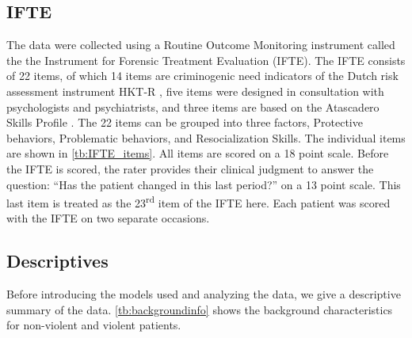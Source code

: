 \documentclass[a4paper,11pt]{article}
\newcommand{\DB}[1]{\todo[inline, color=colorDon]{DB: {#1}}}
\begin{document}
\subsection{IFTE}
The data were collected using a Routine Outcome Monitoring instrument called the the Instrument for Forensic Treatment Evaluation (IFTE).
The IFTE consists of 22 items, of which 14 items are criminogenic need indicators of the Dutch risk assessment instrument HKT-R \parencite{spreen2013handleiding}, five items were designed in consultation with psychologists and psychiatrists, and three items are based on the Atascadero Skills Profile \parencite{vess2001development}.
The 22 items can be grouped into three factors, Protective behaviors, Problematic behaviors, and Resocialization Skills.
The individual items are shown in \autoref{tb:IFTE_items}.
All items are scored on a 18 point scale.
Before the IFTE is scored, the rater provides their clinical judgment to answer the question: ``Has the patient changed in this last period?'' on a 13 point scale.
This last item is treated as the 23\textsuperscript{rd} item of the IFTE here.
Each patient was scored with the IFTE on two separate occasions.




\subsection{Descriptives}
Before introducing the models used and analyzing the data, we give a descriptive summary of the data.
\autoref{tb:backgroundinfo} shows the background characteristics for non-violent and violent patients.
\end{document}
